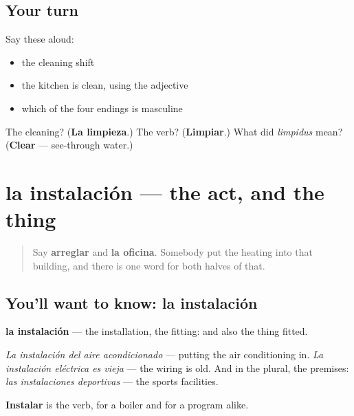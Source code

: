 \subsection*{Your turn}
Say these aloud:

\begin{itemize}
\raggedright
  \item the cleaning shift
  \item the kitchen is clean, using the adjective
  \item which of the four endings is masculine
\end{itemize}

\begin{tcolorbox}[breakable,colback=teal!4,colframe=teal!35!black,title={Before you move on}]
The cleaning? (\textbf{La limpieza}.) The verb? (\textbf{Limpiar}.) What did \emph{limpidus} mean? (\textbf{Clear} — see-through water.)
\end{tcolorbox}
\section[la instalación]{la instalación — the act, and the thing}

\label{lesson:ES-C453-instalacion}



\begin{quote}
Say \textbf{arreglar} and \textbf{la oficina}. Somebody put the heating into that building, and there is one word for both halves of that.
\end{quote}

\subsection*{You'll want to know: la instalación}
\textbf{la instalación} — the installation, the fitting: and also the thing fitted.

\emph{La instalación del aire acondicionado} — putting the air conditioning in. \emph{La instalación eléctrica es vieja} — the wiring is old. And in the plural, the premises: \emph{las instalaciones deportivas} — the sports facilities.

\textbf{Instalar} is the verb, for a boiler and for a program alike.

